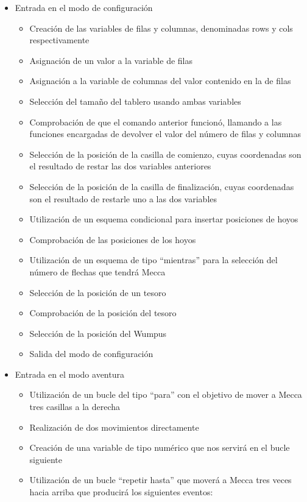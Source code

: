 \documentclass[a4paper,12pt,twoside,openright]{report}
\begin{document}
{  \begin{itemize}
   \item Entrada en el modo de configuración
   \begin{itemize}
    \item Creación de las variables de filas y columnas, denominadas rows y cols respectivamente
    \item Asignación de un valor a la variable de filas
    \item Asignación a la variable de columnas del valor contenido en la de filas
    \item Selección del tamaño del tablero usando ambas variables
    \item Comprobación de que el comando anterior funcionó, llamando a las funciones 
    encargadas de devolver el valor del número de filas y columnas
    \item Selección de la posición de la casilla de comienzo, cuyas coordenadas son el resultado de restar las dos variables anteriores
    \item Selección de la posición de la casilla de finalización, cuyas coordenadas son el resultado de restarle uno a las dos variables
    \item Utilización de un esquema condicional para insertar posiciones de hoyos
    \item Comprobación de las posiciones de los hoyos
    \item Utilización de un esquema de tipo ``mientras'' para la selección del número de flechas que tendrá Mecca
    \item Selección de la posición de un tesoro
    \item Comprobación de la posición del tesoro
    \item Selección de la posición del Wumpus
    \item Salida del modo de configuración
    \end{itemize}
   \item Entrada en el modo aventura
      \begin{itemize}
      \item Utilización de un bucle del tipo ``para'' con el objetivo de mover a Mecca tres casillas a la derecha
      \item Realización de dos movimientos directamente
      \item Creación de una variable de tipo numérico que nos servirá en el bucle siguiente
      \item Utilización de un bucle ``repetir hasta'' que moverá a Mecca tres veces hacia arriba que producirá los siguientes eventos:

\end{itemize}
\end{itemize}}
\end{document}
